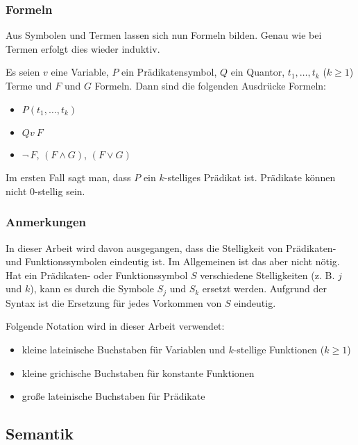 \subsubsection{Formeln}
Aus Symbolen und Termen lassen sich nun Formeln bilden. Genau wie bei Termen erfolgt dies wieder induktiv.
\begin{mydef}[Formeln]
    Es seien $v$ eine Variable, $P$ ein Prädikatensymbol, $Q$ ein Quantor, $t_1,\ldots,t_k$ ($k\geq 1$) Terme und $F$ und $G$ Formeln. Dann sind die folgenden Ausdrücke Formeln:
    \begin{itemize}
       \item  $P(t_1,\ldots,t_k)$
       \item  $Qv\ F$
       \item  $\lnot\,F$, $(F\land G)$, $(F\lor G)$
    \end{itemize}
    Im ersten Fall sagt man, dass $P$ ein $k$-stelliges Prädikat ist. Prädikate können nicht $0$-stellig sein.
\end{mydef}

\subsubsection{Anmerkungen}
In dieser Arbeit wird davon ausgegangen, dass die Stelligkeit von Prädikaten- und Funktionssymbolen eindeutig ist. Im Allgemeinen ist das aber nicht nötig. Hat ein Prädikaten- oder Funktionssymbol $S$ verschiedene Stelligkeiten (z. B. $j$ und $k$), kann es durch die Symbole $S_j$ und $S_k$ ersetzt werden. Aufgrund der Syntax ist die Ersetzung für jedes Vorkommen von $S$ eindeutig.

Folgende Notation wird in dieser Arbeit verwendet:
\begin{itemize}
    \item  kleine lateinische Buchstaben für Variablen und $k$-stellige Funktionen ($k\geq 1$)
    \item  kleine grichische Buchstaben für konstante Funktionen
    \item  große lateinische Buchstaben für Prädikate
\end{itemize}


\subsection{Semantik}

